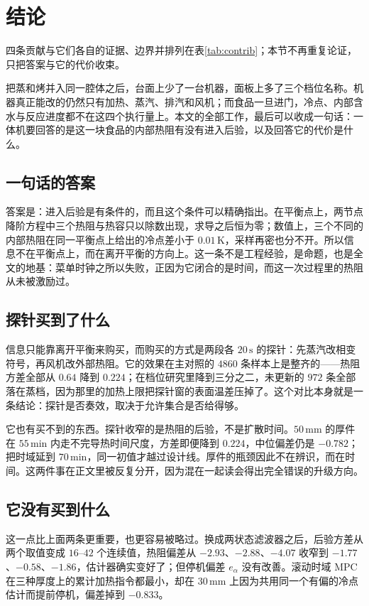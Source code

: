 \section{结论}

四条贡献与它们各自的证据、边界并排列在表\ref{tab:contrib}；本节不再重复论证，只把答案与它的代价收束。

把蒸和烤并入同一腔体之后，台面上少了一台机器，面板上多了三个档位名称。机器真正能改的仍然只有加热、蒸汽、排汽和风机；而食品一旦进门，冷点、内部含水与反应进度都不在这四个执行量上。本文的全部工作，最后可以收成一句话：一体机要回答的是这一块食品的内部热阻有没有进入后验，以及回答它的代价是什么。

\subsection{一句话的答案}

答案是：进入后验是有条件的，而且这个条件可以精确指出。在平衡点上，两节点降阶方程中三个热阻与热容只以除数出现，求导之后恒为零；数值上，三个不同的内部热阻在同一平衡点上给出的冷点差小于 \(0.01\,\mathrm{K}\)，采样再密也分不开。所以信息不在平衡点上，而在离开平衡的方向上。这一条不是工程经验，是命题，也是全文的地基：菜单时钟之所以失败，正因为它闭合的是时间，而这一次过程里的热阻从未被激励过。

\subsection{探针买到了什么}

信息只能靠离开平衡来购买，而购买的方式是两段各 \(20\,\mathrm{s}\) 的探针：先蒸汽改相变符号，再风机改外部热阻。它的效果在主对照的 \(4860\) 条样本上是整齐的——热阻方差全部从 \(0.64\) 降到 \(0.224\)；在档位研究里降到三分之二，未更新的 \(972\) 条全部落在蒸档，因为那里的加热上限把探针窗的表面温差压掉了。这个对比本身就是一条结论：探针是否奏效，取决于允许集合是否给得够。

它也有买不到的东西。探针收窄的是热阻的后验，不是扩散时间。\(50\,\mathrm{mm}\) 的厚件在 \(55\,\mathrm{min}\) 内走不完导热时间尺度，方差即便降到 \(0.224\)，中位偏差仍是 \(-0.782\)；把时域延到 \(70\,\mathrm{min}\)，同一初值才越过设计线。厚件的瓶颈因此不在辨识，而在时间。这两件事在正文里被反复分开，因为混在一起读会得出完全错误的升级方向。

\subsection{它没有买到什么}

这一点比上面两条更重要，也更容易被略过。换成两状态滤波器之后，后验方差从两个取值变成 \(16\)--\(42\) 个连续值，热阻偏差从 \(-2.93\)、\(-2.88\)、\(-4.07\) 收窄到 \(-1.77\)、\(-0.58\)、\(-1.86\)，估计器确实变好了；但停机偏差 \(e_{\alpha}\) 没有改善。滚动时域 MPC 在三种厚度上的累计加热指令都最小，却在 \(30\,\mathrm{mm}\) 上因为共用同一个有偏的冷点估计而提前停机，偏差掉到 \(-0.833\)。

